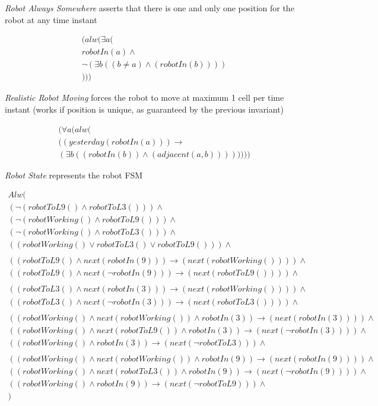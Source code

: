 \textit{Robot Always Somewhere} asserts that there is one and only one position for the robot at any time instant

\nopagebreak
\begin{align*}
	(alw(\exists a (\\
	robotIn(a)\land\\
	\neg(\exists b ((b\neq a)\land(robotIn(b))))\\
	)))
\end{align*}


\textit{Realistic Robot Moving} forces the robot to move at maximum 1 cell per time instant (works if position is unique, as guaranteed by the previous invariant)

\nopagebreak
\begin{align*}
	(\forall a (alw(\\
	((yesterday(robotIn(a)))\longrightarrow\\
	(\exists b ((robotIn(b))\land(adjacent(a,b)))) )
	)))
\end{align*}


\textit{Robot State} represents the robot FSM

\nopagebreak
\begin{align*}
	Alw(\\
	(\neg(robotToL9()\land robotToL3())) \land\\
	(\neg(robotWorking()\land robotToL9())) \land\\
	(\neg(robotWorking()\land robotToL3())) \land\\
	((robotWorking()\lor robotToL3()\lor robotToL9())) \land\\
	\\
	((robotToL9()\land next(robotIn(9)))\longrightarrow(next(robotWorking())))\land\\
	((robotToL9()\land next(\neg robotIn(9)))\longrightarrow(next(robotToL9())))\land\\
	\\
	((robotToL3()\land next(robotIn(3)))\longrightarrow(next(robotWorking())))\land\\
	((robotToL3()\land next(\neg robotIn(3)))\longrightarrow(next(robotToL3())))\land\\
	\\
	((robotWorking()\land next(robotWorking())\land robotIn(3))\longrightarrow(next(robotIn(3))))\land\\
	((robotWorking()\land next(robotToL9())\land robotIn(3))\longrightarrow(next(\neg robotIn(3))))\land\\
	((robotWorking()\land robotIn(3))\longrightarrow(next(\neg robotToL3)))\land\\
	\\
	((robotWorking()\land next(robotWorking())\land robotIn(9))\longrightarrow(next(robotIn(9))))\land\\
	((robotWorking()\land next(robotToL3())\land robotIn(9))\longrightarrow(next(\neg robotIn(9))))\land\\
	((robotWorking()\land robotIn(9))\longrightarrow(next(\neg robotToL9)))\land\\
)
\end{align*}
\newpage

